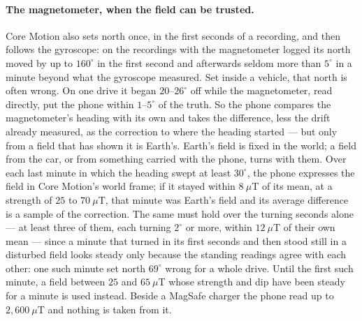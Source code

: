 \documentclass[11pt]{article}
\newcommand{\dg}{^\circ}
\begin{document}
\paragraph{The magnetometer, when the field can be trusted.} Core Motion also sets north once, in the
first seconds of a recording, and then follows the gyroscope: on the recordings with the magnetometer
logged its north moved by up to $160\dg$ in the first second and afterwards seldom more than $5\dg$ in a
minute beyond what the gyroscope measured. Set inside a vehicle, that north is often wrong. On one drive
it began $20$--$26\dg$ off while the magnetometer, read directly, put the phone within $1$--$5\dg$ of the
truth. So the phone compares the magnetometer's heading with its own and takes the difference, less the
drift already measured, as the correction to where the heading started --- but only from a field that
has shown it is Earth's. Earth's field is fixed in the world; a field from the car, or from something
carried with the phone, turns with them. Over each last minute in which the heading swept at least
$30\dg$, the phone expresses the field in Core Motion's world frame; if it stayed within $8~\mu$T of its
mean, at a strength of $25$ to $70~\mu$T, that minute was Earth's field and its average difference is a
sample of the correction. The same must hold over the turning seconds alone --- at least three of them,
each turning $2\dg$ or more, within $12~\mu$T of their own mean --- since a minute that turned in its first
seconds and then stood still in a disturbed field looks steady only because the standing readings
agree with each other: one such minute set north $69\dg$ wrong for a whole drive. Until the first such minute, a field between $25$ and $65~\mu$T whose strength
and dip have been steady for a minute is used instead. Beside a MagSafe charger the phone read up to
$2{,}600~\mu$T and nothing is taken from it.
\end{document}
